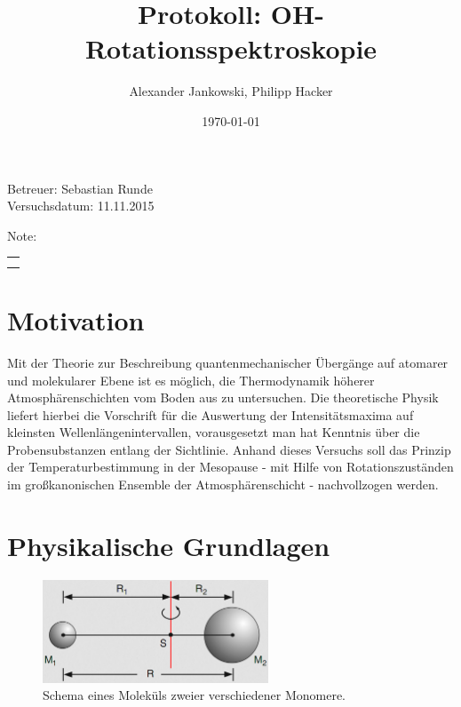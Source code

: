 \documentclass[numbers=noenddot,a4paper,notitlepage,twoside,BCOR15mm]{scrartcl}
\title{Protokoll: OH-Rotationsspektroskopie} %
\author{Alexander Jankowski, Philipp Hacker}
\date{\today}
\begin{document}
	\maketitle
	\begin{center}
		Betreuer: Sebastian Runde\\ %
		Versuchsdatum: 11.11.2015\\ %
		\begin{table}[h]
			\centering
			Note: %
			\begin{tabularx}{1.5cm}{|X|}
				\hline \\ \\
				\hline
			\end{tabularx}
		\end{table}
	\end{center}
	\vspace*{\fill}
	\tableofcontents
	\vfill
	\newpage
	\section{Motivation}

		Mit der Theorie zur Beschreibung quantenmechanischer Übergänge auf atomarer und molekularer Ebene ist es möglich, die Thermodynamik höherer Atmosphärenschichten vom Boden aus zu untersuchen. Die theoretische Physik liefert hierbei die Vorschrift für die Auswertung der Intensitätsmaxima auf kleinsten Wellenlängenintervallen, vorausgesetzt man hat Kenntnis über die Probensubstanzen entlang der Sichtlinie. Anhand dieses Versuchs soll das Prinzip der Temperaturbestimmung in der Mesopause - mit Hilfe von Rotationszuständen im großkanonischen Ensemble der Atmosphärenschicht - nachvollzogen werden.

	\newpage
	\section{Physikalische Grundlagen}

			\begin{figure}[b]
				\centering
				\includegraphics[width=0.6\textwidth]{molekulrotat.png}
				\caption{Schema eines Moleküls zweier verschiedener Monomere.}
				\label{img:molekul}
			\end{figure}
\end{document}

